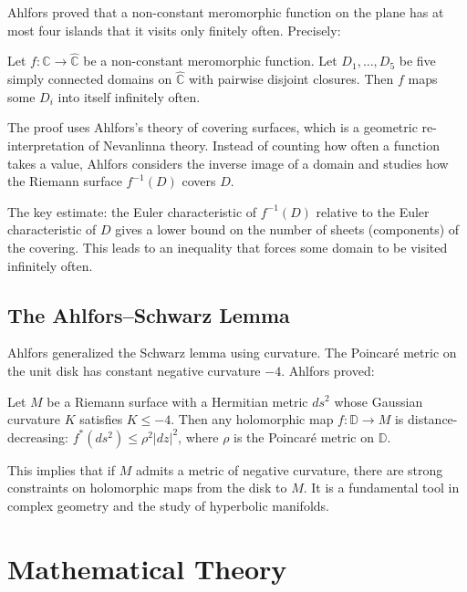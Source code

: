 Ahlfors proved that a non-constant meromorphic function on the plane has at most four islands that it visits only finitely often. Precisely:

\begin{theorem}
Let $f: \mathbb{C} \to \widehat{\mathbb{C}}$ be a non-constant meromorphic function. Let $D_1,\dots,D_5$ be five simply connected domains on $\widehat{\mathbb{C}}$ with pairwise disjoint closures. Then $f$ maps some $D_i$ into itself infinitely often.
\end{theorem}

The proof uses Ahlfors's theory of covering surfaces, which is a geometric re-interpretation of Nevanlinna theory. Instead of counting how often a function takes a value, Ahlfors considers the inverse image of a domain and studies how the Riemann surface $f^{-1}(D)$ covers $D$.

The key estimate: the Euler characteristic of $f^{-1}(D)$ relative to the Euler characteristic of $D$ gives a lower bound on the number of sheets (components) of the covering. This leads to an inequality that forces some domain to be visited infinitely often.

\subsection{The Ahlfors--Schwarz Lemma}

Ahlfors generalized the Schwarz lemma using curvature. The Poincar{\'e} metric on the unit disk has constant negative curvature $-4$. Ahlfors proved:

\begin{theorem}
Let $M$ be a Riemann surface with a Hermitian metric $ds^2$ whose Gaussian curvature $K$ satisfies $K \leq -4$. Then any holomorphic map $f: \mathbb{D} \to M$ is distance-decreasing: $f^*(ds^2) \leq \rho^2|dz|^2$, where $\rho$ is the Poincar{\'e} metric on $\mathbb{D}$.
\end{theorem}

This implies that if $M$ admits a metric of negative curvature, there are strong constraints on holomorphic maps from the disk to $M$. It is a fundamental tool in complex geometry and the study of hyperbolic manifolds.

\section{Mathematical Theory}

